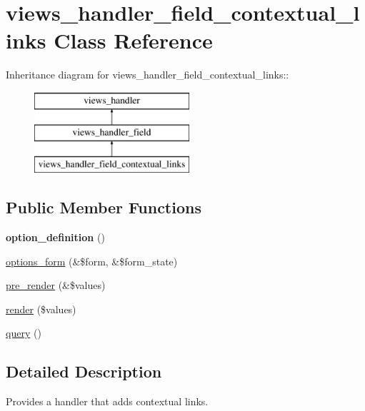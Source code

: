 \hypertarget{classviews__handler__field__contextual__links}{
\section{views\_\-handler\_\-field\_\-contextual\_\-links Class Reference}
\label{classviews__handler__field__contextual__links}
}
Inheritance diagram for views\_\-handler\_\-field\_\-contextual\_\-links::\begin{figure}[H]
\begin{center}
\leavevmode
\includegraphics[height=3cm]{classviews__handler__field__contextual__links}
\end{center}
\end{figure}
\subsection*{Public Member Functions}
\begin{DoxyCompactItemize}
\item 
\hypertarget{classviews__handler__field__contextual__links_a6c41dc2d99fbb64436517200026f63a3}{
{\bfseries option\_\-definition} ()}
\label{classviews__handler__field__contextual__links_a6c41dc2d99fbb64436517200026f63a3}

\item 
\hyperlink{classviews__handler__field__contextual__links_a02d9fbff74abf515e5e093ff437ab792}{options\_\-form} (\&\$form, \&\$form\_\-state)
\item 
\hyperlink{classviews__handler__field__contextual__links_a8ce76077c0fd83c38ebf52649a139d37}{pre\_\-render} (\&\$values)
\item 
\hyperlink{classviews__handler__field__contextual__links_a846ef1ba2d278ef6a251bc7fbfa150cb}{render} (\$values)
\item 
\hyperlink{classviews__handler__field__contextual__links_a317cd0fed32b2f0fe5a11ec01b78eb1a}{query} ()
\end{DoxyCompactItemize}


\subsection{Detailed Description}
Provides a handler that adds contextual links. 

